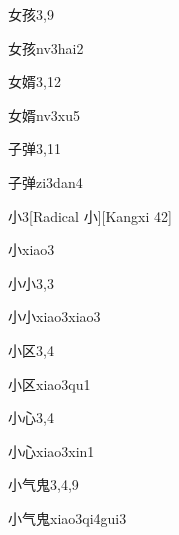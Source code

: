 \begin{entry}{女孩}{3,9}
  \begin{phonetics}{女孩}{nv3hai2}
  \end{phonetics}
\end{entry}

\begin{entry}{女婿}{3,12}
  \begin{phonetics}{女婿}{nv3xu5}
  \end{phonetics}
\end{entry}

\begin{entry}{子弹}{3,11}
  \begin{phonetics}{子弹}{zi3dan4}
  \end{phonetics}
\end{entry}

\begin{entry}{小}{3}[Radical 小][Kangxi 42]
  \begin{phonetics}{小}{xiao3}
  \end{phonetics}
\end{entry}

\begin{entry}{小小}{3,3}
  \begin{phonetics}{小小}{xiao3xiao3}
  \end{phonetics}
\end{entry}

\begin{entry}{小区}{3,4}
  \begin{phonetics}{小区}{xiao3qu1}
  \end{phonetics}
\end{entry}

\begin{entry}{小心}{3,4}
  \begin{phonetics}{小心}{xiao3xin1}
  \end{phonetics}
\end{entry}

\begin{entry}{小气鬼}{3,4,9}
  \begin{phonetics}{小气鬼}{xiao3qi4gui3}
  \end{phonetics}
\end{entry}

